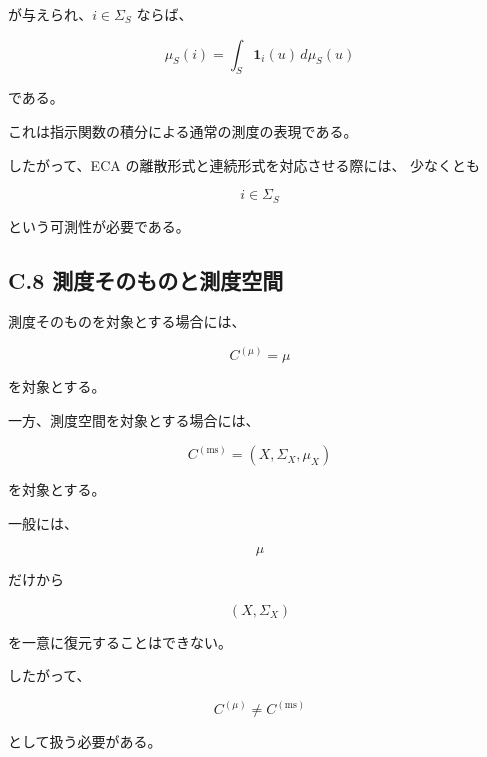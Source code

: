 \documentclass[a4paper,11pt]{article}
\begin{document}
が与えられ、$i\in\Sigma_S$ ならば、

\begin{equation}
    \mu_S(i)
    =
    \int_S
    \mathbf1_i(u)\,d\mu_S(u)
\end{equation}

である。

これは指示関数の積分による通常の測度の表現である。

したがって、ECA の離散形式と連続形式を対応させる際には、
少なくとも

\begin{equation}
    i\in\Sigma_S
\end{equation}

という可測性が必要である。


\subsection{C.8 測度そのものと測度空間}

測度そのものを対象とする場合には、

\begin{equation}
    C^{(\mu)}=\mu
\end{equation}

を対象とする。

一方、測度空間を対象とする場合には、

\begin{equation}
    C^{(\mathrm{ms})}
    =
    (X,\Sigma_X,\mu_X)
\end{equation}

を対象とする。

一般には、

\begin{equation}
    \mu
\end{equation}

だけから

\begin{equation}
    (X,\Sigma_X)
\end{equation}

を一意に復元することはできない。

したがって、

\begin{equation}
    C^{(\mu)}
    \neq
    C^{(\mathrm{ms})}
\end{equation}

として扱う必要がある。

\end{document}
